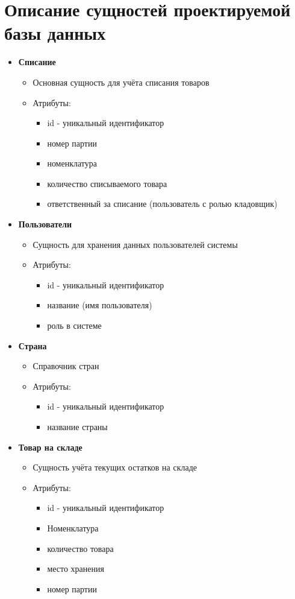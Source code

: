 \section{Описание сущностей проектируемой базы данных}
\begin{itemize}
	\item \textbf{Списание}
	\begin{itemize}
		\item Основная сущность для учёта списания товаров
		\item Атрибуты:
		\begin{itemize}
			\item id - уникальный идентификатор
			\item номер партии
			\item номенклатура
			\item количество списываемого товара
			\item ответственный за списание (пользователь с ролью кладовщик)
		\end{itemize}
	\end{itemize}
	
	\item \textbf{Пользователи}
	\begin{itemize}
		\item Сущность для хранения данных пользователей системы
		\item Атрибуты:
		\begin{itemize}
			\item id - уникальный идентификатор
			\item название (имя пользователя)
			\item роль в системе
		\end{itemize}
	\end{itemize}
	
	\item \textbf{Страна}
	\begin{itemize}
		\item Справочник стран
		\item Атрибуты:
		\begin{itemize}
			\item id - уникальный идентификатор
			\item название страны
		\end{itemize}
	\end{itemize}
	
	\item \textbf{Товар на складе}
	\begin{itemize}
		\item Сущность учёта текущих остатков на складе
		\item Атрибуты:
		\begin{itemize}
			\item id - уникальный идентификатор
			\item Номенклатура
			\item количество товара
			\item место хранения
			\item номер партии
		\end{itemize}
	\end{itemize}
	

\end{itemize}

